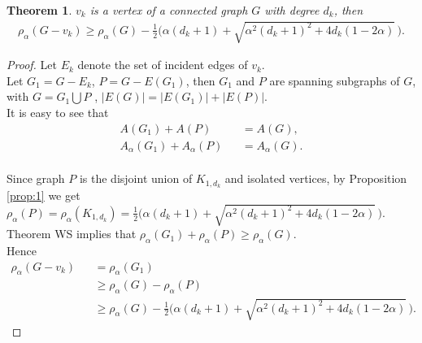 \documentclass[amsthm]{elsart}
\newtheorem{theorem}{Theorem}[section]
\begin{document}
\begin{theorem} \label{the:0}
$v_k$ is a vertex of a connected graph $G$ with degree $d_k$, then
\begin{eqnarray*}
\rho _\alpha (G - v_k) \geqslant \rho _\alpha (G) - \frac{1}{2} \big( \alpha (d_k + 1) + \sqrt{\alpha ^2 (d_k + 1)^2 + 4 d_k (1-2\alpha)} \, \big).
\end{eqnarray*}
\end{theorem}
\begin{proof} Let $E_k $ denote the set of incident edges of $v_k$.
 \\ Let $G_1 = G - E_k$, $P = G - E(G_1)$,
 then $G_1$ and $P$ are spanning subgraphs of $G$, with
 $G = G_1 \bigcup P$ ,
 $|E(G)| = |E(G_1)| + |E(P)|$.
\\ It is easy to see that
\begin{eqnarray*}
 A(G_1) + A(P) \quad &&= A(G),
\\  A_\alpha (G_1) + A_\alpha (P) &&= A_\alpha (G).
\end{eqnarray*}
\\ Since graph $P$ is the disjoint union of $K_{1,d_k}$ and isolated vertices, by Proposition \ref{prop:1} we get $\rho _\alpha (P) = \rho _\alpha (K_{1,d_k}) = \frac{1}{2} \big( \alpha (d_k + 1) + \sqrt{\alpha ^2 (d_k + 1)^2 + 4 d_k (1-2\alpha)} \, \big). $
\\ Theorem WS implies that $\rho _\alpha (G_1) + \rho _\alpha (P) \geqslant \rho _\alpha (G)$.
\\ Hence
\begin{eqnarray*}
\rho _\alpha (G - v_k) &&= \rho _\alpha (G_1)
\\ && \geqslant \rho _\alpha (G) - \rho _\alpha (P)
\\ && \geqslant \rho _\alpha (G) - \frac{1}{2} \big( \alpha (d_k + 1) + \sqrt{\alpha ^2 (d_k + 1)^2 + 4 d_k (1-2\alpha)} \, \big).
\end{eqnarray*}
\end{proof}
\end{document}
